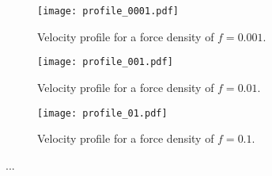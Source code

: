 \documentclass[a4paper,10pt,bibtotoc]{scrartcl}
\begin{document}
\begin{figure}[ht]
\begin{subfigure}{.5\textwidth}
  \centering
  \texttt{[image: profile\_0001.pdf]}  
  \caption{Velocity profile for a force density of $f=0.001$.}
  \label{fig:profile_1}
\end{subfigure}
\begin{subfigure}{.5\textwidth}
  \centering
  \texttt{[image: profile\_001.pdf]}  
  \caption{Velocity profile for a force density of $f=0.01$.}
  \label{fig:profile_2}
\end{subfigure}
\begin{subfigure}{.5\textwidth}
  \centering
  \texttt{[image: profile\_01.pdf]}  
  \caption{Velocity profile for a force density of $f=0.1$.}
  \label{fig:profile_3}
\end{subfigure}
\caption{...}
\label{fig:fig}
\end{figure}
\end{document}
